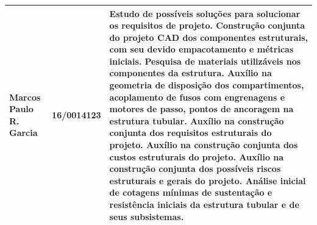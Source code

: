 \begin{apendicesenv}
\begin{table}[H]
\begin{adjustbox}{max width = \textwidth}
\begin{tabular}{|G{4cm}|c|L{10cm}|}
        Marcos Paulo R. Garcia & 16/0014123 &  Estudo de possíveis soluç{\~o}es para solucionar os requisitos de projeto. Construção conjunta do projeto CAD dos componentes estruturais, com seu devido empacotamento e métricas iniciais. Pesquisa de materiais utilizáveis nos componentes da estrutura. Auxílio na geometria de disposição dos compartimentos, acoplamento de fusos com engrenagens e motores de passo, pontos de ancoragem na estrutura tubular. Auxílio na construção conjunta dos requisitos estruturais do projeto. Auxílio na construção conjunta dos custos estruturais do projeto. Auxílio na construção conjunta dos possíveis riscos estruturais e gerais do projeto. Análise inicial de cotagens mínimas de sustentaç{\~a}o e resist{\^e}ncia iniciais da estrutura tubular e de seus subsistemas.    \\ \hline
        \end{tabular}
    \end{adjustbox}
\end{table}



\end{apendicesenv}
